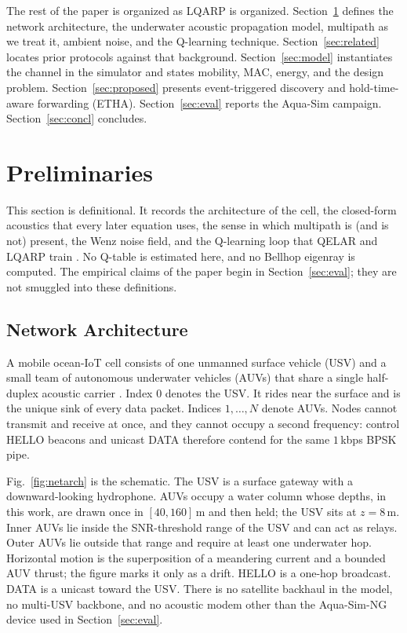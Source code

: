 \documentclass[journal]{IEEEtran}
\begin{document}
The rest of the paper is organized as LQARP is organized.
Section~\ref{sec:prelim} defines the network architecture, the
underwater acoustic propagation model, multipath as we treat it,
ambient noise, and the Q-learning technique.
Section~\ref{sec:related} locates prior protocols against that
background.
Section~\ref{sec:model} instantiates the channel in the simulator and
states mobility, MAC, energy, and the design problem.
Section~\ref{sec:proposed} presents event-triggered discovery and
hold-time-aware forwarding (ETHA).
Section~\ref{sec:eval} reports the Aqua-Sim campaign.
Section~\ref{sec:concl} concludes.

\section{Preliminaries}
\label{sec:prelim}

This section is definitional. It records the architecture of the
cell, the closed-form acoustics that every later equation uses, the
sense in which multipath is (and is not) present, the Wenz noise
field, and the Q-learning loop that QELAR and LQARP train
\cite{hu2010qelar,liu2026lqarp}.
No Q-table is estimated here, and no Bellhop eigenray is computed.
The empirical claims of the paper begin in
Section~\ref{sec:eval}; they are not smuggled into these definitions.

\subsection{Network Architecture}
\label{sec:arch}

A mobile ocean-IoT cell consists of one unmanned surface vehicle
(USV) and a small team of autonomous underwater vehicles (AUVs) that
share a single half-duplex acoustic carrier
\cite{akyildiz2005uasn,sozer2000uan}.
Index $0$ denotes the USV. It rides near the surface and is the unique
sink of every data packet. Indices $1,\ldots,N$ denote AUVs.
Nodes cannot transmit and receive at once, and they cannot occupy a
second frequency: control HELLO beacons and unicast DATA therefore
contend for the same $1$\,kbps BPSK pipe.

Fig.~\ref{fig:netarch} is the schematic.
The USV is a surface gateway with a downward-looking hydrophone.
AUVs occupy a water column whose depths, in this work, are drawn once
in $[40,160]$\,m and then held; the USV sits at $z=8$\,m.
Inner AUVs lie inside the SNR-threshold range of the USV and can act
as relays. Outer AUVs lie outside that range and require at least one
underwater hop.
Horizontal motion is the superposition of a meandering current
\cite{caruso2008mcm} and a bounded AUV thrust; the figure marks it
only as a drift.
HELLO is a one-hop broadcast. DATA is a unicast toward the USV.
There is no satellite backhaul in the model, no multi-USV backbone,
and no acoustic modem other than the Aqua-Sim-NG device used in
Section~\ref{sec:eval}.
\end{document}

